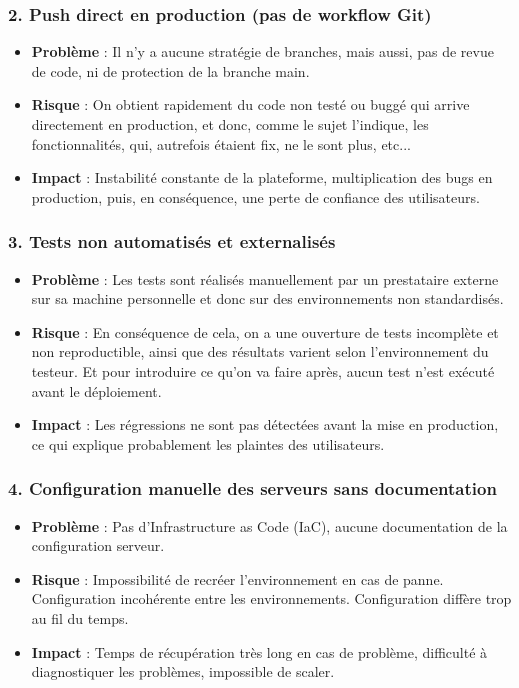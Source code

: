 \documentclass{article}
\begin{document}
\subsubsection{2. Push direct en production (pas de workflow Git)}
\begin{itemize}
    \item \textbf{Problème} : Il n'y a aucune stratégie de branches, mais aussi, pas de revue de code, ni de protection de la branche main.
    \item \textbf{Risque} : On obtient rapidement du code non testé ou buggé qui arrive directement en production, et donc, comme le sujet l'indique, les fonctionnalités, qui, autrefois étaient fix, ne le sont plus, etc...
    \item \textbf{Impact} : Instabilité constante de la plateforme, multiplication des bugs en production, puis, en conséquence, une perte de confiance des utilisateurs.
\end{itemize}

\subsubsection{3. Tests non automatisés et externalisés}
\begin{itemize}
    \item \textbf{Problème} : Les tests sont réalisés manuellement par un prestataire externe sur sa machine personnelle et donc sur des environnements non standardisés.
    \item \textbf{Risque} : En conséquence de cela, on a une ouverture de tests incomplète et non reproductible, ainsi que des résultats varient selon l'environnement du testeur. Et pour introduire ce qu'on va faire après, aucun test n'est exécuté avant le déploiement.
    \item \textbf{Impact} : Les régressions ne sont pas détectées avant la mise en production, ce qui explique probablement les plaintes des utilisateurs.
\end{itemize}

\subsubsection{4. Configuration manuelle des serveurs sans documentation}
\begin{itemize}
    \item \textbf{Problème} : Pas d'Infrastructure as Code (IaC), aucune documentation de la configuration serveur.
    \item \textbf{Risque} : Impossibilité de recréer l'environnement en cas de panne. Configuration incohérente entre les environnements. Configuration diffère trop au fil du temps.
    \item \textbf{Impact} : Temps de récupération très long en cas de problème, difficulté à diagnostiquer les problèmes, impossible de scaler.
\end{itemize}
\end{document}
